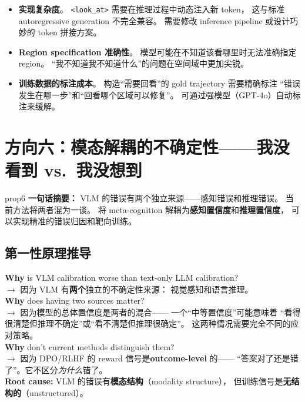 \documentclass[12pt,a4paper]{article}
\begin{document}
\begin{riskbox}
\begin{itemize}[leftmargin=1.5em]
  \item \textbf{实现复杂度}。
    \texttt{<look\_at>} 需要在推理过程中动态注入新 token，
    这与标准 autoregressive generation 不完全兼容。
    需要修改 inference pipeline 或设计巧妙的 token 拼接方案。
  \item \textbf{Region specification 准确性}。
    模型可能在不知道该看哪里时无法准确指定 region。
    ``我不知道我不知道什么''的问题在空间域中更加尖锐。
  \item \textbf{训练数据的标注成本}。
    构造``需要回看''的 gold trajectory 需要精确标注
    ``错误发生在哪一步''和``回看哪个区域可以修复''。
    可通过强模型（GPT-4o）自动标注来缓解。
\end{itemize}
\end{riskbox}


\newpage
\section{方向六：模态解耦的不确定性——我没看到 vs.\ 我没想到}
\label{sec:prop6}

\begin{proposalbox}{prop6}
\textbf{一句话摘要：}
VLM 的错误有两个独立来源——感知错误和推理错误。
当前方法将两者混为一谈。
将 meta-cognition 解耦为\textbf{感知置信度}和\textbf{推理置信度}，
可以实现精准的错误归因和靶向训练。
\end{proposalbox}

\subsection{第一性原理推导}

\begin{whybox}
\textbf{Why} is VLM calibration worse than text-only LLM calibration?\\
$\rightarrow$ 因为 VLM 有\textbf{两个}独立的不确定性来源：
视觉感知和语言推理。\\[3pt]
\textbf{Why} does having two sources matter?\\
$\rightarrow$ 因为模型的总体置信度是两者的混合——
一个``中等置信度''可能意味着
``看得很清楚但推理不确定''或``看不清楚但推理很确定''。
这两种情况需要完全不同的应对策略。\\[3pt]
\textbf{Why} don't current methods distinguish them?\\
$\rightarrow$ 因为 DPO/RLHF 的 reward 信号是\textbf{outcome-level} 的——
``答案对了还是错了''。它不区分\textit{为什么}错了。\\[3pt]
\textbf{Root cause:}
VLM 的错误有\textbf{模态结构}（modality structure），
但训练信号是\textbf{无结构的}（unstructured）。
\end{whybox}
\end{document}
